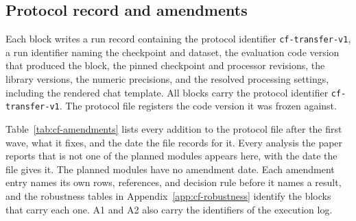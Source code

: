 \subsection{Protocol record and amendments}
\label{app:repro-protocol}

Each block writes a run record containing the protocol identifier \texttt{cf-transfer-v1}, a run identifier naming the checkpoint and dataset, the evaluation code version that produced the block, the pinned checkpoint and processor revisions, the library versions, the numeric precisions, and the resolved processing settings, including the rendered chat template. All \cfBlocks{} blocks carry the protocol identifier \texttt{cf-transfer-v1}. The protocol file registers the code version it was frozen against.

Table~\ref{tab:cf-amendments} lists every addition to the protocol file after the first wave, what it fixes, and the date the file records for it. Every analysis the paper reports that is not one of the planned modules appears here, with the date the file gives it. The \cfCoveragePlannedWord{} planned modules have no amendment date. Each amendment entry names its own rows, references, and decision rule before it names a result, and the robustness tables in Appendix~\ref{app:cf-robustness} identify the blocks that carry each one. A1 and A2 also carry the identifiers of the execution log.

